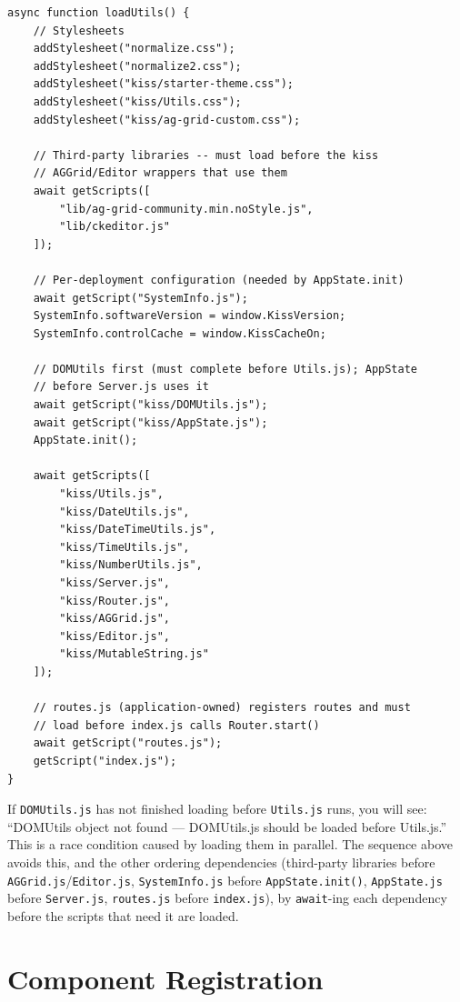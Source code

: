 \begin{lstlisting}[style=javascript]
async function loadUtils() {
    // Stylesheets
    addStylesheet("normalize.css");
    addStylesheet("normalize2.css");
    addStylesheet("kiss/starter-theme.css");
    addStylesheet("kiss/Utils.css");
    addStylesheet("kiss/ag-grid-custom.css");

    // Third-party libraries -- must load before the kiss
    // AGGrid/Editor wrappers that use them
    await getScripts([
        "lib/ag-grid-community.min.noStyle.js",
        "lib/ckeditor.js"
    ]);

    // Per-deployment configuration (needed by AppState.init)
    await getScript("SystemInfo.js");
    SystemInfo.softwareVersion = window.KissVersion;
    SystemInfo.controlCache = window.KissCacheOn;

    // DOMUtils first (must complete before Utils.js); AppState
    // before Server.js uses it
    await getScript("kiss/DOMUtils.js");
    await getScript("kiss/AppState.js");
    AppState.init();

    await getScripts([
        "kiss/Utils.js",
        "kiss/DateUtils.js",
        "kiss/DateTimeUtils.js",
        "kiss/TimeUtils.js",
        "kiss/NumberUtils.js",
        "kiss/Server.js",
        "kiss/Router.js",
        "kiss/AGGrid.js",
        "kiss/Editor.js",
        "kiss/MutableString.js"
    ]);

    // routes.js (application-owned) registers routes and must
    // load before index.js calls Router.start()
    await getScript("routes.js");
    getScript("index.js");
}
\end{lstlisting}

\begin{warnbox}
If \texttt{DOMUtils.js} has not finished loading before \texttt{Utils.js} runs, you will see: ``DOMUtils object not found --- DOMUtils.js should be loaded before Utils.js.''  This is a race condition caused by loading them in parallel.  The sequence above avoids this, and the other ordering dependencies (third-party libraries before \texttt{AGGrid.js}/\texttt{Editor.js}, \texttt{SystemInfo.js} before \texttt{AppState.init()}, \texttt{AppState.js} before \texttt{Server.js}, \texttt{routes.js} before \texttt{index.js}), by \texttt{await}-ing each dependency before the scripts that need it are loaded.
\end{warnbox}

\section{Component Registration}
\label{sec:fe-components}

